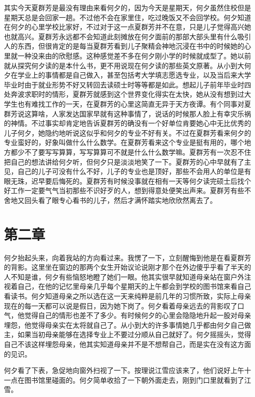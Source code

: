 \documentclass[UTF8]{ctexart}
\begin{document}
    其实今天夏群芳是最没有理由来看何夕的，因为今天是星期天，何夕虽然住校但是星期天总是会回家一趟。不过他不会在家里住，吃过晚饭又不会回学校。何夕知道在何夕的心里学校比家好，不过对于这一点夏群芳并不在意，只是儿子觉得高兴她也就高兴。夏群芳永远都不会知道此刻摊放在何夕面前的那部大部头里有什么吸引人的东西，但很肯定的是每当夏群芳看到儿子聚精会神地沉浸在书中的时候她的心里就一种没来由的欣慰感。这种感觉差不多在何夕刚小学的时候就成型了。她以前就从探究何夕读的是本什么书，更不用说现在何夕读的那些英文原著。从小到大何夕在学业上的事情都是自己做入，甚至包括考大学填志愿选专业，以及当后来大学毕业时由于就业形势不好又转回去读硕士时等等都是如此。想起儿子前年毕业时四处奔波求职时的情形，夏群芳就感到这个世界变化得实在太快，她从没有想到过大学生也有难找工作的一天，在夏群芳的心里这简直无异于天方夜谭。有个同事对夏群芳说这算啥，人家发达国家早就有这种事情了，说话的时候那人脸上有幸灾乐祸的神情。不过事实却肯定地告诉夏群芳的确没有一个好单位肯要她心中无比优秀的儿子何夕，她隐约地听说这似乎和何夕的专业不好有关。不过在夏群芳看来何夕的专业蛮好的，好象叫做什么什么数学。在夏群芳看来这个专业是挺有用的，哪个地方都少不了要写写算算，写写算算可不就是什么什么数学嘛。夏群芳有一次忍不住把自己的想法讲给何夕听，但何夕只是淡淡地笑了一下。夏群芳的心中早就有了主见，自己的儿子可没有什么不好，儿子的专业也是顶好，那些不会用人的单位是有眼无珠，迟早要后悔死的。夏群芳有时候没事就在相有一天等何夕读完硕士后找个好工作一定要气气当初那些不识好歹的人，想到得意处便笑出声来。夏群芳有些不舍地又回头看了眼专心看书的儿子，然后才满怀踏实地欣欣然离去了。
\clearpage
\section*{第二章}

何夕抬起头来，向着我站的方向看过来。我愣了一下，立刻醒悔到他是在看夏群芳的背影。这里坐在窗边的那两个女生开始议论说刚才那个在外边傻乎乎看了半天的人不知是谁，何夕有些恼怒地瞪了她们一眼。他其实很早就知道母亲站在窗户外注视着自己，在他的记忆里母亲几乎每个星期天的上午都会到学校的图书馆来看自己看读书。何夕知道母亲之所以选在这一天来纯粹是前几年的习惯所致，实际上母亲现在的每一天都可以说是假日，因为她下岗了。何夕看着母亲远去的背影叹了口气，他觉得自己的情形也差不了多少。有时候何夕的心里会隐隐地升起一股对母亲埋怨，他觉得母亲实在太将就自己了。从小到大的许多事情她几乎都由何夕自己做主，如果当初母亲能够在选择专业上不要过分顺从自己就好了。何夕摇摇头，觉得自己不该这样埋怨母亲，他其实知道母亲并不是不想帮自己，而是实在没有这方面的见识。

何夕看了下表，急促地向窗外扫视了一下。按理说江雪应该来了，他们说好上午十一点在图书馆里碰面的。何夕简单收拾了一下朝外面走去，刚到门口里就看到了江雪。
\end{document}
